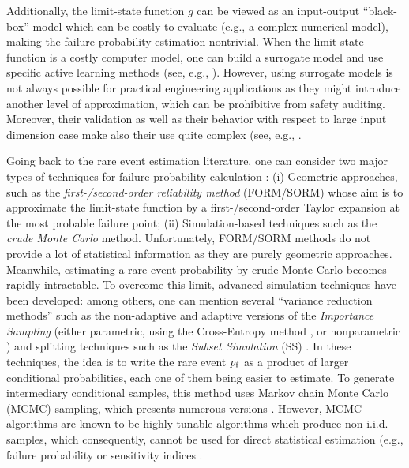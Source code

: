 Additionally, the limit-state function $g$ can be viewed as an input-output ``black-box'' model which can be costly to evaluate (e.g., a complex numerical model), making the failure probability estimation nontrivial. 
When the limit-state function is a costly computer model, one can build a surrogate model and use specific active learning methods (see, e.g., \citet{moustapha_ss_2022}). 
However, using surrogate models is not always possible for practical engineering applications as they might introduce another level of approximation, which can be prohibitive from safety auditing. 
Moreover, their validation as well as their behavior with respect to large input dimension case make also their use quite complex (see, e.g.,  \citep{Marrel_Iooss_Chab_ICSCREAM_2020}.

Going back to the rare event estimation literature, one can consider two major types of techniques for failure probability calculation \citep{MorioBalesdent2015}: (i) Geometric approaches, such as the \emph{first-/second-order reliability method} (FORM/SORM) whose aim is to approximate the limit-state function by a first-/second-order Taylor expansion at the most probable failure point; (ii) Simulation-based techniques such as the \emph{crude Monte Carlo} method. 
Unfortunately, FORM/SORM methods do not provide a lot of statistical information as they are purely geometric approaches.
Meanwhile, estimating a rare event probability by crude Monte Carlo becomes rapidly intractable. 
To overcome this limit, advanced simulation techniques have been developed: among others, one can mention several ``variance reduction methods'' such as the non-adaptive and adaptive versions of the \emph{Importance Sampling} \citep{RubinsteinKroese1981} (either parametric, using the Cross-Entropy method \citet{NKurtz_JSong_StrucSaf_2013}, or nonparametric \citet{Morio_RESS_2011}) and splitting techniques \citep{cerou2012sequential} such as the \emph{Subset Simulation} (SS) \citet{AuBeck2001}. 
In these techniques, the idea is to write the rare event $p_\mathrm{f}$ as a product of larger conditional probabilities, each one of them being easier to estimate. 
To generate intermediary conditional samples, this method uses Markov chain Monte Carlo (MCMC) sampling, which presents numerous versions \citep{Papaioannou_PEM_2015}. 
However, MCMC algorithms are known to be highly tunable algorithms which produce non-i.i.d. samples, which consequently, cannot be used for direct statistical estimation (e.g., failure probability or sensitivity indices \citep{daveiga_iooss_2021}. 

